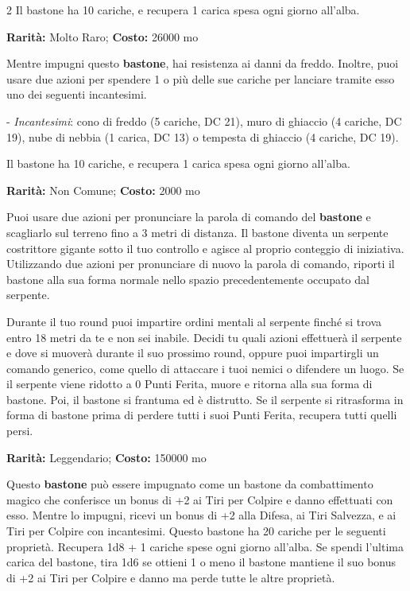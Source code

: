 \begin{multicols}{2}
Il bastone ha 10 cariche, e recupera 1 carica spesa ogni giorno all'alba.


\textbf{Rarità:} Molto Raro; \textbf{Costo:} 26000 mo

Mentre impugni questo \textbf{bastone}, hai resistenza ai danni da freddo.
Inoltre, puoi usare due azioni per spendere 1 o più delle sue cariche per lanciare tramite esso uno dei seguenti incantesimi.

- \emph{Incantesimi}: cono di freddo (5 cariche, DC 21), muro di ghiaccio (4 cariche, DC 19), nube di nebbia (1 carica, DC 13) o tempesta di ghiaccio (4 cariche, DC 19).

Il bastone ha 10 cariche, e recupera 1 carica spesa ogni giorno all'alba.


\textbf{Rarità:} Non Comune; \textbf{Costo:} 2000 mo

Puoi usare due azioni per pronunciare la parola di comando del \textbf{bastone} e scagliarlo sul terreno fino a 3 metri di distanza. Il bastone diventa un serpente costrittore gigante sotto il tuo controllo e agisce al proprio conteggio di iniziativa. Utilizzando due azioni per pronunciare di nuovo la parola di comando, riporti il bastone alla sua forma normale nello spazio precedentemente occupato dal serpente.

Durante il tuo round puoi impartire ordini mentali al serpente finché si trova entro 18 metri da te e non sei inabile. Decidi tu quali azioni effettuerà il serpente e dove si muoverà durante il suo prossimo round, oppure puoi impartirgli un comando generico, come quello di attaccare i tuoi nemici o difendere un luogo. Se il serpente viene ridotto a 0 Punti Ferita, muore e ritorna alla sua forma di bastone. Poi, il bastone si frantuma ed è distrutto. Se il serpente si ritrasforma in forma di bastone prima di perdere tutti i suoi Punti Ferita, recupera tutti quelli persi.


\textbf{Rarità:} Leggendario; \textbf{Costo:} 150000 mo

Questo \textbf{bastone} può essere impugnato come un bastone da combattimento magico che conferisce un bonus di +2 ai Tiri per Colpire e danno effettuati con esso. Mentre lo impugni, ricevi un bonus di +2 alla Difesa, ai Tiri Salvezza, e ai Tiri per Colpire con incantesimi. Questo bastone ha 20 cariche per le seguenti proprietà. Recupera 1d8 + 1 cariche spese ogni giorno all'alba. Se spendi l'ultima carica del bastone, tira 1d6 se ottieni 1 o meno il bastone mantiene il suo bonus di +2 ai Tiri per Colpire e danno ma perde tutte le altre proprietà.


\end{multicols}
